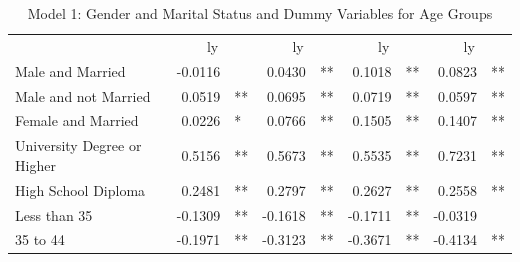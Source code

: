 \documentclass[12pt]{article}
\begin{document}
\begin{table}[!h]
\caption{Model 1: Gender and Marital Status and Dummy Variables for Age Groups}
\centering
\begin{tabular}{lllllllll}
\cline{1-9}
\multicolumn{1}{r}{} &
  \multicolumn{2}{c}{ly} &
  \multicolumn{2}{c}{ly} &
  \multicolumn{2}{c}{ly} &
  \multicolumn{2}{c}{ly} \\
\cline{1-9}
\multicolumn{1}{l}{Male and Married} &
  \multicolumn{1}{r}{-0.0116} &
  \multicolumn{1}{l}{} &
  \multicolumn{1}{r}{0.0430} &
  \multicolumn{1}{l}{**} &
  \multicolumn{1}{r}{0.1018} &
  \multicolumn{1}{l}{**} &
  \multicolumn{1}{r}{0.0823} &
  \multicolumn{1}{l}{**} \\
\multicolumn{1}{l}{Male and not Married} &
  \multicolumn{1}{r}{0.0519} &
  \multicolumn{1}{l}{**} &
  \multicolumn{1}{r}{0.0695} &
  \multicolumn{1}{l}{**} &
  \multicolumn{1}{r}{0.0719} &
  \multicolumn{1}{l}{**} &
  \multicolumn{1}{r}{0.0597} &
  \multicolumn{1}{l}{**} \\
\multicolumn{1}{l}{Female and Married} &
  \multicolumn{1}{r}{0.0226} &
  \multicolumn{1}{l}{*} &
  \multicolumn{1}{r}{0.0766} &
  \multicolumn{1}{l}{**} &
  \multicolumn{1}{r}{0.1505} &
  \multicolumn{1}{l}{**} &
  \multicolumn{1}{r}{0.1407} &
  \multicolumn{1}{l}{**} \\
\multicolumn{1}{l}{University Degree or Higher} &
  \multicolumn{1}{r}{0.5156} &
  \multicolumn{1}{l}{**} &
  \multicolumn{1}{r}{0.5673} &
  \multicolumn{1}{l}{**} &
  \multicolumn{1}{r}{0.5535} &
  \multicolumn{1}{l}{**} &
  \multicolumn{1}{r}{0.7231} &
  \multicolumn{1}{l}{**} \\
\multicolumn{1}{l}{High School Diploma} &
  \multicolumn{1}{r}{0.2481} &
  \multicolumn{1}{l}{**} &
  \multicolumn{1}{r}{0.2797} &
  \multicolumn{1}{l}{**} &
  \multicolumn{1}{r}{0.2627} &
  \multicolumn{1}{l}{**} &
  \multicolumn{1}{r}{0.2558} &
  \multicolumn{1}{l}{**} \\
\multicolumn{1}{l}{Less than 35} &
  \multicolumn{1}{r}{-0.1309} &
  \multicolumn{1}{l}{**} &
  \multicolumn{1}{r}{-0.1618} &
  \multicolumn{1}{l}{**} &
  \multicolumn{1}{r}{-0.1711} &
  \multicolumn{1}{l}{**} &
  \multicolumn{1}{r}{-0.0319} &
  \multicolumn{1}{l}{} \\
\multicolumn{1}{l}{35 to 44} &
  \multicolumn{1}{r}{-0.1971} &
  \multicolumn{1}{l}{**} &
  \multicolumn{1}{r}{-0.3123} &
  \multicolumn{1}{l}{**} &
  \multicolumn{1}{r}{-0.3671} &
  \multicolumn{1}{l}{**} &
  \multicolumn{1}{r}{-0.4134} &
  \multicolumn{1}{l}{**} \\

\end{tabular}
\end{table}
\end{document}
